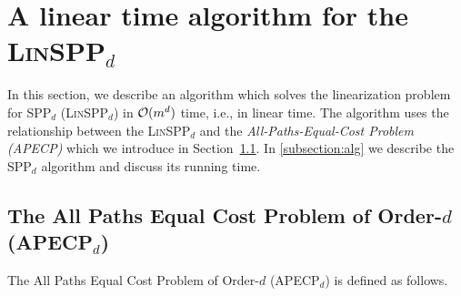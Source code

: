 \section{A linear time algorithm for the \textsc{Lin}SPP$_d$}\label{algo:sec}
In this section, we describe an algorithm which solves the linearization problem for SPP$_d$ (\textsc{Lin}SPP$_d$) in  $\mathcal{O}(m^d)$ time, i.e., in linear time.
The algorithm uses the relationship between the \textsc{Lin}SPP$_d$ and the  \emph{All-Paths-Equal-Cost Problem (APECP)} which we introduce in  Section~\ref{APEC:ssec}.  
In \cref{subsection:alg} we describe the SPP$_d$ algorithm and discuss
its running time.

 \subsection{The All Paths Equal Cost Problem of Order-$d$ (APECP$_d$)}
\label{APEC:ssec}

The All Paths  Equal Cost Problem of Order-$d$ (APECP$_d$) is defined as follows.
\begin{center}
\end{center}

